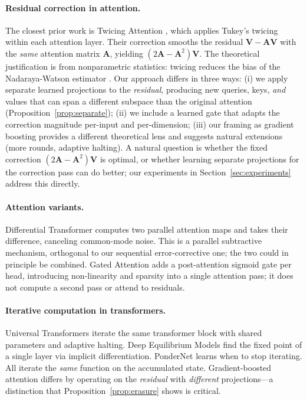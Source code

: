 \documentclass{article}
\theoremstyle{definition}
\begin{document}
\paragraph{Residual correction in attention.}
The closest prior work is Twicing Attention \citep{abdullaev2025twicing}, which applies Tukey's twicing \citep{tukey1977exploratory} within each attention layer.
Their correction smooths the residual $\mathbf{V} - \mathbf{A}\mathbf{V}$ with the \emph{same} attention matrix $\mathbf{A}$, yielding $(2\mathbf{A} - \mathbf{A}^2)\mathbf{V}$.
The theoretical justification is from nonparametric statistics: twicing reduces the bias of the Nadaraya-Watson estimator \citep{newey2004twicing}.
Our approach differs in three ways: (i) we apply separate learned projections to the \emph{residual}, producing new queries, keys, \emph{and} values that can span a different subspace than the original attention (Proposition~\ref{prop:separate}); (ii) we include a learned gate that adapts the correction magnitude per-input and per-dimension; (iii) our framing as gradient boosting provides a different theoretical lens and suggests natural extensions (more rounds, adaptive halting).
A natural question is whether the fixed correction $(2\mathbf{A} - \mathbf{A}^2)\mathbf{V}$ is optimal, or whether learning separate projections for the correction pass can do better; our experiments in Section~\ref{sec:experiments} address this directly.

\paragraph{Attention variants.}
Differential Transformer \citep{ye2025differential} computes two parallel attention maps and takes their difference, canceling common-mode noise.
This is a parallel subtractive mechanism, orthogonal to our sequential error-corrective one; the two could in principle be combined.
Gated Attention \citep{qiu2025gated} adds a post-attention sigmoid gate per head, introducing non-linearity and sparsity into a single attention pass; it does not compute a second pass or attend to residuals.

\paragraph{Iterative computation in transformers.}
Universal Transformers \citep{dehghani2019universal} iterate the same transformer block with shared parameters and adaptive halting.
Deep Equilibrium Models \citep{bai2019deep} find the fixed point of a single layer via implicit differentiation.
PonderNet \citep{banino2021pondernet} learns when to stop iterating.
All iterate the \emph{same} function on the accumulated state.
Gradient-boosted attention differs by operating on the \emph{residual} with \emph{different} projections---a distinction that Proposition~\ref{prop:erasure} shows is critical.
\end{document}
